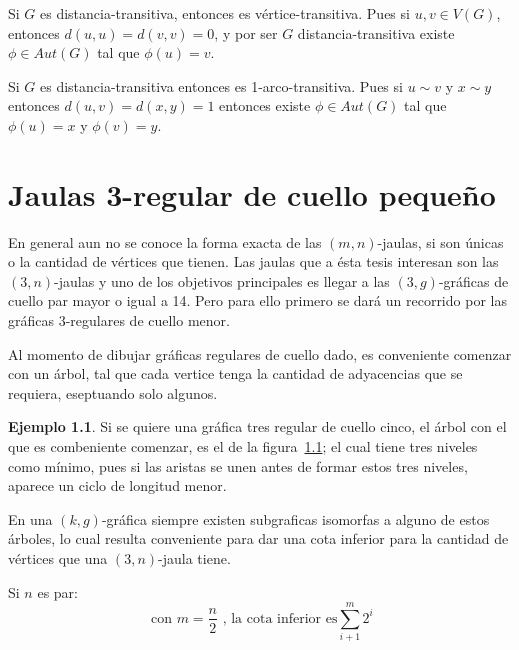 \documentclass[11pt]{book}
\theoremstyle{definition}
\newtheorem{example}{Ejemplo}
\begin{document}
Si $G$ es distancia-transitiva, entonces es
vértice-transitiva. Pues si $u,v \in V(G)$, entonces
$d(u,u)=d(v,v)=0$, y por ser $G$ distancia-transitiva existe
$\phi\in Aut(G)$ tal que $\phi(u)=v$.

Si $G$ es distancia-transitiva entonces es
1-arco-transitiva. Pues si $u\sim v$ y $x\sim y$ entonces
$d(u,v)=d(x,y)=1$ entonces existe $\phi \in Aut(G)$ tal que
$\phi(u)=x$ y $\phi(v)=y$.

\chapter{Jaulas 3-regular de cuello pequeño}

En general aun no se conoce la forma exacta de las $(m,n)$-jaulas, si
son únicas o la cantidad de vértices que tienen. Las jaulas que a ésta
tesis interesan son las $(3,n)$-jaulas y uno de los objetivos
principales es llegar a las $(3,g)$-gráficas de cuello par mayor o
igual a 14. Pero para ello primero se dará un recorrido por las
gráficas $3$-regulares de cuello menor. 

Al momento de dibujar gráficas regulares de cuello dado, es conveniente
comenzar con un árbol, tal que cada vertice tenga la cantidad de
adyacencias que se requiera, eseptuando solo algunos.

\begin{example}
Si se quiere una gráfica tres regular de cuello cinco,
el árbol con el que es combeniente comenzar, es el de la figura~\ref{arbol}; el cual tiene tres niveles
como mínimo, pues si las aristas se unen antes de formar estos tres
niveles, aparece un ciclo de longitud menor.

\begin{figure}[htb]
  \centering
  \caption{} \label{arbol}
\end{figure}
\end{example}

En una $(k,g)$-gráfica siempre existen subgraficas isomorfas a alguno
de estos árboles, lo cual resulta conveniente para dar una
cota inferior para la cantidad de vértices que una $(3,n)$-jaula
tiene.

Si $n$ es par:
\begin{equation*}
\text{  con } m=\frac{n}{2} \text{ , la cota inferior es} \sum^{m}_{i+1}2^i
\end{equation*}
\end{document}
